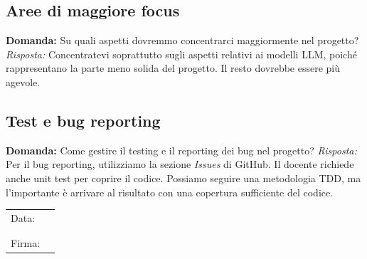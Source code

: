 \documentclass{article}
\begin{document}
\subsection{Aree di maggiore focus} \textbf{Domanda:} Su quali aspetti dovremmo concentrarci maggiormente nel progetto?
\newline
\textit{Risposta:} Concentratevi soprattutto sugli aspetti relativi ai modelli LLM, poiché rappresentano la parte meno solida del progetto. Il resto dovrebbe essere più agevole.

\subsection{Test e bug reporting} \textbf{Domanda:} Come gestire il testing e il reporting dei bug nel progetto?
\newline
\textit{Risposta:} Per il bug reporting, utilizziamo la sezione \textit{Issues} di GitHub. Il docente richiede anche unit test per coprire il codice. Possiamo seguire una metodologia TDD, ma l'importante è arrivare al risultato con una copertura sufficiente del codice.

\begin{table}[b]
    \begin{tabular}{@{}p{.5in}p{4in}@{}}
    Data:  & \hrulefill \\
           &     		\\
           &     		\\
    Firma: & \hrulefill \\
    \end{tabular}
\end{table}
\end{document}
